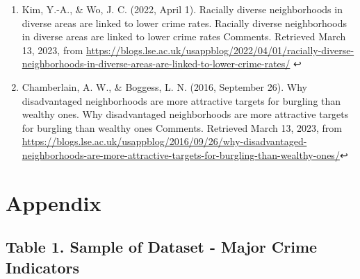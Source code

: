 \documentclass[
]{article}
\begin{document}
\begin{enumerate}
\item
  Kim, Y.-A., \& Wo, J. C. (2022, April 1). Racially diverse
  neighborhoods in diverse areas are linked to lower crime rates.
  Racially diverse neighborhoods in diverse areas are linked to lower
  crime rates Comments. Retrieved March 13, 2023, from
  \url{https://blogs.lse.ac.uk/usappblog/2022/04/01/racially-diverse-neighborhoods-in-diverse-areas-are-linked-to-lower-crime-rates/}
  ↩︎
\item
  Chamberlain, A. W., \& Boggess, L. N. (2016, September 26). Why
  disadvantaged neighborhoods are more attractive targets for burgling
  than wealthy ones. Why disadvantaged neighborhoods are more attractive
  targets for burgling than wealthy ones Comments. Retrieved March 13,
  2023, from
  \url{https://blogs.lse.ac.uk/usappblog/2016/09/26/why-disadvantaged-neighborhoods-are-more-attractive-targets-for-burgling-than-wealthy-ones/}↩︎
\end{enumerate}

\hypertarget{appendix}{%
\section{Appendix}\label{appendix}}

\hypertarget{table-1.-sample-of-dataset---major-crime-indicators}{%
\subsection{Table 1. Sample of Dataset - Major Crime
Indicators}\label{table-1.-sample-of-dataset---major-crime-indicators}}
\end{document}
